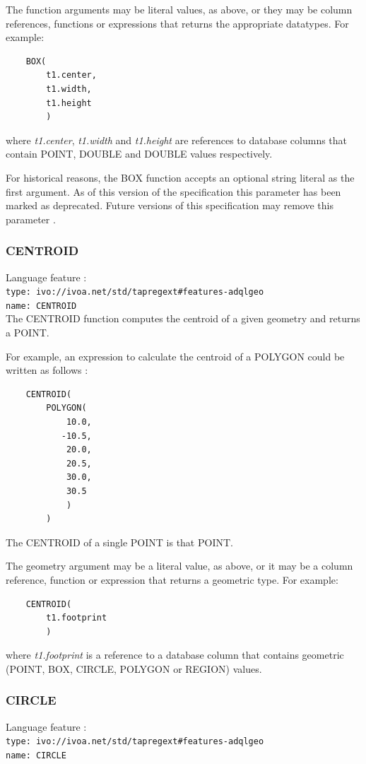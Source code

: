 \documentclass[11pt,a4paper]{ivoa}
\begin{document}
The function arguments may be literal values, as above, or they may be
column references, functions or expressions that returns the appropriate
datatypes.
For example:
\begin{verbatim}
    BOX(
        t1.center,
        t1.width,
        t1.height
        )
\end{verbatim}
where \textit{t1.center}, \textit{t1.width} and \textit{t1.height}
are references to database columns that contain POINT, DOUBLE
and DOUBLE values respectively.

For historical reasons, the BOX function accepts an optional string literal as
the first argument.
As of this version of the specification this parameter has been
marked as deprecated.
Future versions of this specification may remove this parameter
.

\subsubsection{CENTROID}
\label{sec:functions.geom.centroid}
{\footnotesize Language feature :}\\
{\footnotesize \verb|type: ivo://ivoa.net/std/tapregext#features-adqlgeo|}\\
{\footnotesize \verb|name: CENTROID|}\\

The CENTROID function computes the centroid of a given geometry and returns a POINT.

For example, an expression to calculate the centroid of a POLYGON could
be written as follows :
\begin{verbatim}
    CENTROID(
        POLYGON(
            10.0,
           -10.5,
            20.0,
            20.5,
            30.0,
            30.5
            )
        )
\end{verbatim}

The CENTROID of a single POINT is that POINT.

The geometry argument may be a literal value, as above, or it may be a
column reference, function or expression that returns a geometric type.
For example:
\begin{verbatim}
    CENTROID(
        t1.footprint
        )
\end{verbatim}
where \textit{t1.footprint} is a reference to a database column that
contains geometric (POINT, BOX, CIRCLE, POLYGON or REGION) values.

\subsubsection{CIRCLE}
\label{sec:functions.geom.circle}
{\footnotesize Language feature :}\\
{\footnotesize \verb|type: ivo://ivoa.net/std/tapregext#features-adqlgeo|}\\
{\footnotesize \verb|name: CIRCLE|}\\
\end{document}
